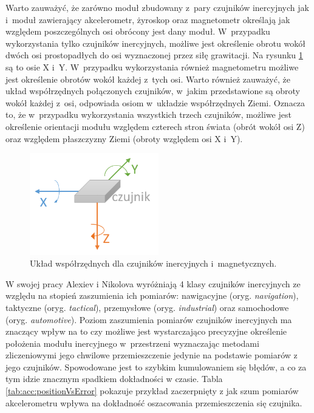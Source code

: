 Warto zauważyć, że zarówno moduł zbudowany z~pary czujników inercyjnych jak i~moduł zawierający akcelerometr, żyroskop oraz magnetometr określają jak względem poszczególnych osi obrócony jest dany moduł. W~przypadku wykorzystania tylko czujników inercyjnych, możliwe jest określenie obrotu wokół dwóch osi prostopadłych do osi wyznaczonej przez siłę grawitacji. Na rysunku \ref{fig:literature:imu:coordination} są to osie X i~Y. W~przypadku wykorzystania również magnetometru możliwe jest określenie obrotów wokół każdej z~tych osi. Warto również zauważyć, że układ współrzędnych połączonych czujników, w~jakim przedstawione są obroty wokół każdej z~osi, odpowiada osiom w~układzie współrzędnych Ziemi. Oznacza to, że w~przypadku wykorzystania wszystkich trzech czujników, możliwe jest określenie orientacji modułu względem czterech stron świata (obrót wokół osi Z) oraz względem płaszczyzny Ziemi (obroty względem osi X i~Y).
			
\begin{savenotes}
	\begin{figure}[!htb]
		\centering	
		\includegraphics[width=0.5\textwidth]{images/IMUAxes.png}
		\caption{Układ współrzędnych dla czujników inercyjnych i~magnetycznych.}
		\label{fig:literature:imu:coordination}
	\end{figure}
\end{savenotes}

W swojej pracy Alexiev i Nikolova \cite{Alexiev2013} wyróżniają 4 klasy czujników inercyjnych ze względu na stopień zaszumienia ich pomiarów: nawigacyjne (oryg. \emph{navigation}), taktyczne  (oryg. \emph{tactical}), przemysłowe  (oryg. \emph{industrial}) oraz samochodowe  (oryg. \emph{automotive}). Poziom zaszumienia pomiarów czujników inercyjnych ma znaczący wpływ na to czy możliwe jest wystarczająco precyzyjne określenie położenia modułu inercyjnego w~przestrzeni wyznaczając metodami zliczeniowymi jego chwilowe przemieszczenie jedynie na podstawie pomiarów z jego czujników. Spowodowane jest to szybkim kumulowaniem się błędów, a co za tym idzie znacznym spadkiem dokładności w czasie. Tabla \ref{tab:acc:positionVsError} pokazuje przykład zaczerpnięty z \cite{Alexiev2013} jak szum pomiarów akcelerometru wpływa na dokładność oszacowania przemieszczenia się czujnika.

